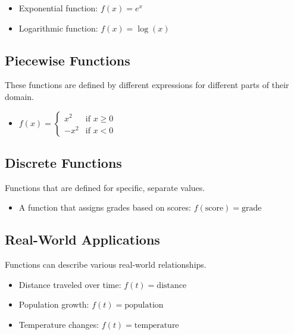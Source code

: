 \documentclass[12pt]{article}
\begin{document}
\begin{itemize}
    \item Exponential function: \( f(x) = e^x \)
    \item Logarithmic function: \( f(x) = \log(x) \)
\end{itemize}

\subsection*{Piecewise Functions}

These functions are defined by different expressions for different parts of their domain.

\begin{itemize}
    \item \( f(x) = \begin{cases} 
    x^2 & \text{if } x \geq 0 \\
    -x^2 & \text{if } x < 0 
    \end{cases} \)
\end{itemize}

\subsection*{Discrete Functions}

Functions that are defined for specific, separate values.

\begin{itemize}
    \item A function that assigns grades based on scores: \( f(\text{score}) = \text{grade} \)
\end{itemize}

\subsection*{Real-World Applications}

Functions can describe various real-world relationships.

\begin{itemize}
    \item Distance traveled over time: \( f(t) = \text{distance} \)
    \item Population growth: \( f(t) = \text{population} \)
    \item Temperature changes: \( f(t) = \text{temperature} \)
\end{itemize}
\end{document}
